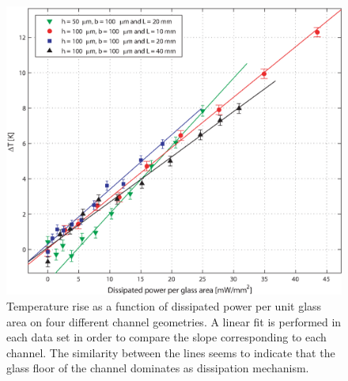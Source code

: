\documentclass[twocolumn]{svjour3}       %
\begin{document}
\begin{figure}[h!]
\centering
\includegraphics[width=\columnwidth]{figs/rectas.eps}
\caption{Temperature rise as a function of dissipated power per unit glass area on four different channel geometries. A linear fit is performed in each data set in order to compare the slope corresponding to each channel. The similarity between the lines seems to indicate that the glass floor of the channel dominates as dissipation mechanism.\label{fig:rectas}}
\end{figure}




\end{document}
